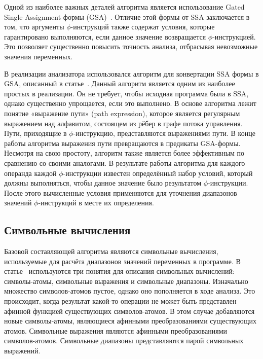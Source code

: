 Одной из наиболее важных деталей алгоритма является использование
Gated Single Assignment формы
(GSA)~\cite{ottenstein1990program}. Отличие этой формы от SSA
заключается в том, что аргументы $\phi$-инструкций также содержат
условия, которые гарантировано выполняются, если данное значение
возвращается $\phi$-инструкцией. Это позволяет существенно повысить
точность анализа, отбрасывая невозможные значения переменных.

В реализации анализатора использовался алгоритм для конвертации SSA
формы в GSA, описанный в статье~\cite{tu1995efficient}. Данный
алгоритм является одним из наиболее простых в реализации. Он не
требует, чтобы исходная программа была в SSA, однако существенно
упрощается, если это выполнено. В основе алгоритма лежит понятие
«выражение пути» (path expression), которое является регулярным
выражением над алфавитом, состоящем из рёбер в графе потока
управления. Пути, приходящие в $\phi$-инструкцию, представляются
выражениями пути. В конце работы алгоритма выражения пути превращаются
в предикаты GSA-формы. Несмотря на свою простоту, алгоритм также
является более эффективным по сравнению со своими аналогами. В
результате работы алгоритма для каждого операнда каждой
$\phi$-инструкции известен определённый набор условий, который должны
выполняться, чтобы данное значение было результатом
$\phi$-инструкции. После этого вычисленные условия применяются для
уточнения диапазонов значений $\phi$-инструкций в месте их определения.

\subsection{Символьные вычисления}

Базовой составляющей алгоритма являются символьные вычисления,
используемые для расчёта диапазонов значений переменных в программе. В
статье~\cite{li2010practical} используются три понятия для описания
символьных вычислений: символы-атомы, символьные выражения и
символьные диапазоны. Изначально множество символов-атомов пустое,
однако оно пополняется в ходе анализа. Это происходит, когда результат
какой-то операции не может быть представлен афинной функцией
существующих символов-атомов. В этом случае добавляются новые
символы-атомы, являющиеся афинными преобразованиями существующих
атомов. Символьные выражения являются афинными преобразованиями
символов-атомов. Символьные диапазоны представляются парой символьных
выражений.

